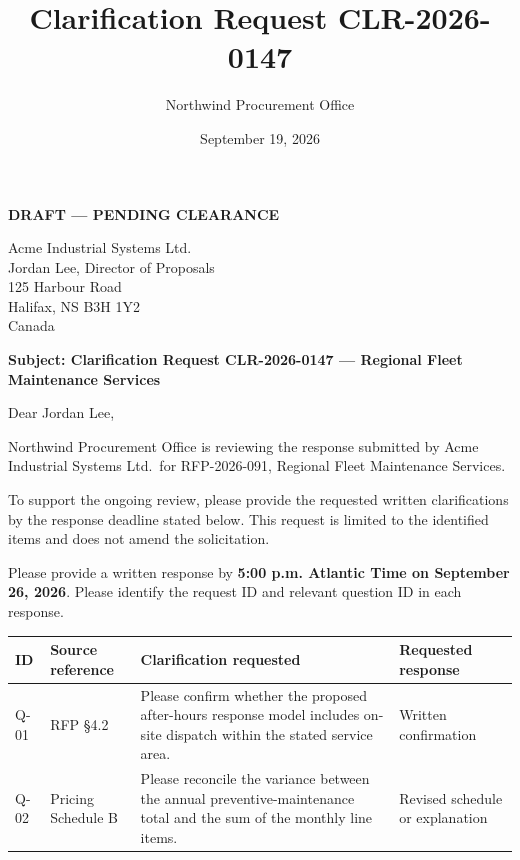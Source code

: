 \documentclass[
]{article}
\title{Clarification Request CLR-2026-0147}
\author{Northwind Procurement Office}
\date{September 19, 2026}
\newcounter{none} %
\begin{document}
\maketitle

\textbf{DRAFT --- PENDING CLEARANCE}

Acme Industrial Systems Ltd.\\
Jordan Lee, Director of Proposals\\
125 Harbour Road\\
Halifax, NS B3H 1Y2\\
Canada

\textbf{Subject: Clarification Request CLR-2026-0147 --- Regional Fleet
Maintenance Services}

Dear Jordan Lee,

Northwind Procurement Office is reviewing the response submitted by Acme
Industrial Systems Ltd.~for RFP-2026-091, Regional Fleet Maintenance
Services.

To support the ongoing review, please provide the requested written
clarifications by the response deadline stated below. This request is
limited to the identified items and does not amend the solicitation.

Please provide a written response by \textbf{5:00 p.m. Atlantic Time on
September 26, 2026}. Please identify the request ID and relevant
question ID in each response.

{\def\LTcaptype{none} %
\begin{longtable}[]{@{}
  >{\raggedright\arraybackslash}p{}
  >{\raggedright\arraybackslash}p{}
  >{\raggedright\arraybackslash}p{}
  >{\raggedright\arraybackslash}p{}@{}}
\toprule\noalign{}
\begin{minipage}[b]{\linewidth}\raggedright
ID
\end{minipage} & \begin{minipage}[b]{\linewidth}\raggedright
Source reference
\end{minipage} & \begin{minipage}[b]{\linewidth}\raggedright
Clarification requested
\end{minipage} & \begin{minipage}[b]{\linewidth}\raggedright
Requested response
\end{minipage} \\
\midrule\noalign{}
\endhead
\bottomrule\noalign{}
\endlastfoot
Q-01 & RFP §4.2 & Please confirm whether the proposed after-hours
response model includes on-site dispatch within the stated service area.
& Written confirmation \\
Q-02 & Pricing Schedule B & Please reconcile the variance between the
annual preventive-maintenance total and the sum of the monthly line
items. & Revised schedule or explanation \\
\end{longtable}
}
\end{document}
